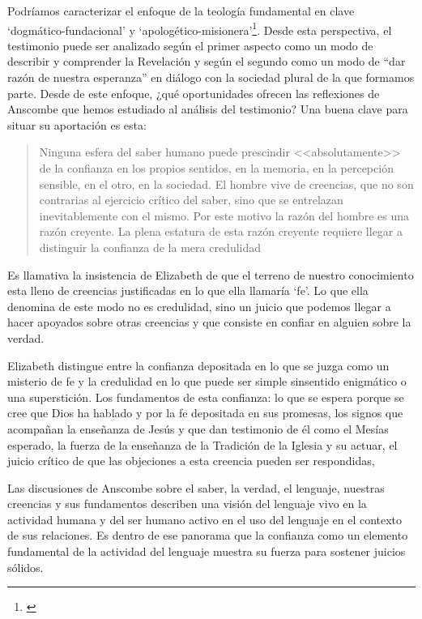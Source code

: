 Podríamos caracterizar el enfoque de la teología fundamental en clave `dogmático-fundacional' y `apologético-misionera'\footnote{\Cite[Cf.][80-85]{ninot2009tf}}. Desde esta perspectiva, el testimonio puede ser analizado según el primer aspecto como un modo de describir y comprender la Revelación y según el segundo como un modo de ``dar razón de nuestra esperanza'' en diálogo con la sociedad plural de la que formamos parte. Desde de este enfoque, ¿qué oportunidades ofrecen las reflexiones de Anscombe que hemos estudiado al análisis del testimonio? Una buena clave para situar su aportación es esta: \blockquote[{\Cite[451]{prades2015testimonio}}]{Ninguna esfera del saber humano puede prescindir <<absolutamente>> de la confianza en los propios sentidos, en la memoria, en la percepción sensible, en el otro, en la sociedad. El hombre vive de creencias, que no son contrarias al ejercicio crítico del saber, sino que se entrelazan inevitablemente con el mismo. Por este motivo la razón del hombre es una razón creyente. La plena estatura de esta razón creyente requiere llegar a distinguir la confianza de la mera credulidad}. Es llamativa la insistencia de Elizabeth de que el terreno de nuestro conocimiento esta lleno de creencias justificadas en lo que ella llamaría `fe'. Lo que ella denomina de este modo no es credulidad, sino un juicio que podemos llegar a hacer apoyados sobre otras creencias y que consiste en confiar en alguien sobre la verdad.

Elizabeth distingue entre la confianza depositada en lo que se juzga como un misterio de fe y la credulidad en lo que puede ser simple sinsentido enigmático o una superstición. Los fundamentos de esta confianza: lo que se espera porque se cree que Dios ha hablado y por la fe depositada en sus promesas, los signos que acompañan la enseñanza de Jesús y que dan testimonio de él como el Mesías esperado, la fuerza de la enseñanza de la Tradición de la Iglesia y su actuar, el juicio crítico de que las objeciones a esta creencia pueden ser respondidas,



Las discusiones de Anscombe sobre el saber, la verdad, el lenguaje, nuestras creencias y sus fundamentos describen una visión del lenguaje vivo en la actividad humana y del ser humano activo en el uso del lenguaje en el contexto de sus relaciones. Es dentro de ese panorama que la confianza como un elemento fundamental de la actividad del lenguaje muestra su fuerza para sostener juicios sólidos.



